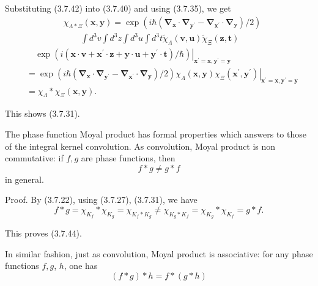 \documentclass{article}
\begin{document}
Substituting (3.7.42) into (3.7.40) and using (3.7.35), we get
$$
\begin{align*}
& \chi_{\Lambda * \Xi}(\boldsymbol{x}, \boldsymbol{y})=\exp \left(i \hbar\left(\boldsymbol{\nabla}_{\boldsymbol{x}} \cdot \boldsymbol{\nabla}_{\boldsymbol{y}^{\prime}}-\boldsymbol{\nabla}_{\boldsymbol{x}^{\prime}} \cdot \boldsymbol{\nabla}_{\boldsymbol{y}}\right) / 2\right)  \tag{3.7.43}\\
& \qquad \int d^{3} v \int d^{3} z \int d^{3} u \int d^{3} t \tilde{\chi}_{\Lambda}(\boldsymbol{v}, \boldsymbol{u}) \tilde{\chi}_{\Xi}(\boldsymbol{z}, \boldsymbol{t})
\end{align*}
$$
$$
\begin{aligned}
& \left.\quad \exp \left(i\left(\boldsymbol{x} \cdot \boldsymbol{v}+\boldsymbol{x}^{\prime} \cdot \boldsymbol{z}+\boldsymbol{y} \cdot \boldsymbol{u}+\boldsymbol{y}^{\prime} \cdot \boldsymbol{t}\right) / \hbar\right)\right|_{\boldsymbol{x}^{\prime}=\boldsymbol{x}, \boldsymbol{y}^{\prime}=\boldsymbol{y}} \\
& =\left.\exp \left(i \hbar\left(\boldsymbol{\nabla}_{\boldsymbol{x}} \cdot \boldsymbol{\nabla}_{\boldsymbol{y}^{\prime}}-\boldsymbol{\nabla}_{\boldsymbol{x}^{\prime}} \cdot \boldsymbol{\nabla}_{\boldsymbol{y}}\right) / 2\right) \chi_{\Lambda}(\boldsymbol{x}, \boldsymbol{y}) \chi_{\Xi}\left(\boldsymbol{x}^{\prime}, \boldsymbol{y}^{\prime}\right)\right|_{\boldsymbol{x}^{\prime}=\boldsymbol{x}, \boldsymbol{y}^{\prime}=\boldsymbol{y}} \\
& =\chi_{\Lambda} * \chi_{\Xi}(\boldsymbol{x}, \boldsymbol{y}) .
\end{aligned}
$$

This shows (3.7.31).

The phase function Moyal product has formal properties which answers to those of the integral kernel convolution. As convolution, Moyal product is non commutative: if $f, g$ are phase functions, then
$$
\begin{equation*}
f * g \neq g * f \tag{3.7.44}
\end{equation*}
$$
in general.

Proof. By (3.7.22), using (3.7.27), (3.7.31), we have
$$
\begin{equation*}
f * g=\chi_{K_{f}} * \chi_{K_{g}}=\chi_{K_{f} * K_{g}} \neq \chi_{K_{g} * K_{f}}=\chi_{K_{g}} * \chi_{K_{f}}=g * f . \tag{3.7.45}
\end{equation*}
$$

This proves (3.7.44).

In similar fashion, just as convolution, Moyal product is associative: for any phase functions $f, g$, $h$, one has
$$
\begin{equation*}
(f * g) * h=f *(g * h) \tag{3.7.46}
\end{equation*}
$$
\end{document}

